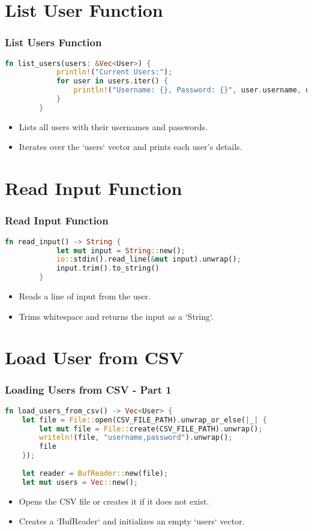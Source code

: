 \documentclass[aspectratio=169, table]{beamer}
\begin{document}
\section{List User Function}
\begin{frame}[fragile]
	\frametitle{List Users Function}
	\begin{lstlisting}[language=Rust]
		fn list_users(users: &Vec<User>) {
			println!("Current Users:");
			for user in users.iter() {
				println!("Username: {}, Password: {}", user.username, user.password);
			}
		}
	\end{lstlisting}
	\begin{itemize}
		\item Lists all users with their usernames and passwords.
		\item Iterates over the `users` vector and prints each user's details.
	\end{itemize}
\end{frame}

\section{Read Input Function}
\begin{frame}[fragile]
	\frametitle{Read Input Function}
	\begin{lstlisting}[language=Rust]
		fn read_input() -> String {
			let mut input = String::new();
			io::stdin().read_line(&mut input).unwrap();
			input.trim().to_string()
		}
	\end{lstlisting}
	\begin{itemize}
		\item Reads a line of input from the user.
		\item Trims whitespace and returns the input as a `String`.
	\end{itemize}
\end{frame}

\section{Load User from CSV}

\begin{frame}[fragile]
\frametitle{Loading Users from CSV - Part 1}
\begin{lstlisting}[language=Rust]
fn load_users_from_csv() -> Vec<User> {
	let file = File::open(CSV_FILE_PATH).unwrap_or_else(|_| {
		let mut file = File::create(CSV_FILE_PATH).unwrap();
		writeln!(file, "username,password").unwrap();
		file
	});
	
	let reader = BufReader::new(file);
	let mut users = Vec::new();
\end{lstlisting}
\begin{itemize}
	\item Opens the CSV file or creates it if it does not exist.
	\item Creates a `BufReader` and initializes an empty `users` vector.
\end{itemize}
\end{frame}
	
\end{document}
